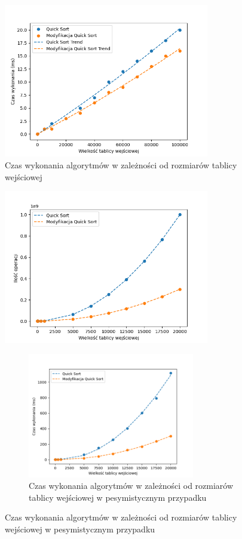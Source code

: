 \documentclass{article}
\begin{document}
\begin{figure}[H]
    \centering
    \includegraphics[width=0.8\textwidth]{Figure_2.png}
    \caption{Czas wykonania algorytmów w zależności od rozmiarów tablicy wejściowej}
    \label{fig:quicksortt}
\end{figure}
\begin{figure}[H]
    \centering
    \includegraphics[width=0.8\textwidth]{Figure_7.png}
    \caption{Ilość operacji algorytmu w zależności od rozmiarów tablicy wejściowej w pesymistycznym przypadku}
    \label{fig:quicksortp}
    \begin{figure}[H]
    \centering
    \includegraphics[width=0.8\textwidth]{Figure_8.png}
    \caption{Czas wykonania algorytmów w zależności od rozmiarów tablicy wejściowej w pesymistycznym przypadku}
    \label{fig:quicksorttp}
\end{figure}
\end{figure}
\end{document}
